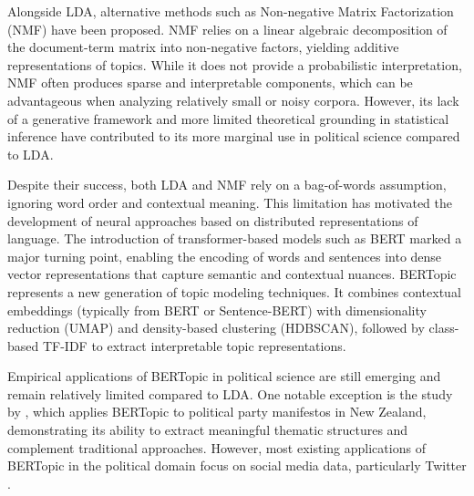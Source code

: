 \documentclass{article}
\begin{document}
Alongside LDA, alternative methods such as Non-negative Matrix Factorization (NMF) \citep{lee1999nmf} have been proposed. NMF relies on a linear algebraic decomposition of the document-term matrix into non-negative factors, yielding additive representations of topics. While it does not provide a probabilistic interpretation, NMF often produces sparse and interpretable components, which can be advantageous when analyzing relatively small or noisy corpora. However, its lack of a generative framework and more limited theoretical grounding in statistical inference have contributed to its more marginal use in political science compared to LDA.

Despite their success, both LDA and NMF rely on a bag-of-words assumption, ignoring word order and contextual meaning. This limitation has motivated the development of neural approaches based on distributed representations of language. The introduction of transformer-based models such as BERT marked a major turning point, enabling the encoding of words and sentences into dense vector representations that capture semantic and contextual nuances. BERTopic \citep{grootendorst2022bertopic} represents a new generation of topic modeling techniques. It combines contextual embeddings (typically from BERT or Sentence-BERT) with dimensionality reduction (UMAP) and density-based clustering (HDBSCAN), followed by class-based TF-IDF to extract interpretable topic representations.

Empirical applications of BERTopic in political science are still emerging and remain relatively limited compared to LDA. One notable exception is the study by \citet{orellana2023nlp}, which applies BERTopic to political party manifestos in New Zealand, demonstrating its ability to extract meaningful thematic structures and complement traditional approaches. However, most existing applications of BERTopic in the political domain focus on social media data, particularly Twitter  \citep{mendonca2024twitterverse}.
\end{document}
